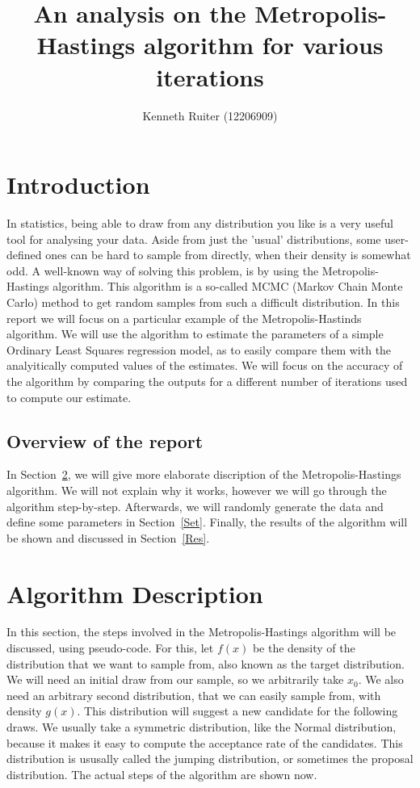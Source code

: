 \documentclass[a4paper,10pt]{article}\usepackage[]{graphicx}\usepackage[]{color}
\title{An analysis on the Metropolis-Hastings algorithm for various iterations}
\author{Kenneth Ruiter (12206909)}
\begin{document}


\maketitle
\newpage

\tableofcontents
\newpage

\section{Introduction}

In statistics, being able to draw from any distribution you like is a very useful tool for analysing your data. Aside from just the 'usual' distributions, some user-defined ones can be hard to sample from directly, when their density is somewhat odd. A well-known way of solving this problem, is by using the Metropolis-Hastings algorithm. This algorithm is a so-called MCMC (Markov Chain Monte Carlo) method to get random samples from such a difficult distribution. In this report we will focus on a particular example of the Metropolis-Hastinds algorithm. We will use the algorithm to estimate the parameters of a simple Ordinary Least Squares regression model, as to easily compare them with the analyitically computed values of the estimates. We will focus on the accuracy of the algorithm by comparing the outputs for a different number of iterations used to compute our estimate.

\subsection{Overview of the report}
In Section~\ref{AD}, we will give more elaborate discription of the Metropolis-Hastings algorithm. We will not explain why it works, however we will go through the algorithm step-by-step. Afterwards, we will randomly generate the data and define some parameters in Section~\ref{Set}. Finally, the results of the algorithm will be shown and discussed in Section~\ref{Res}.

\newpage
\section{Algorithm Description}\label{AD}

In this section, the steps involved in the Metropolis-Hastings algorithm will be discussed, using pseudo-code. For this, let $f(x)$ be the density of the distribution that we want to sample from, also known as the target distribution. We will need an initial draw from our sample, so we arbitrarily take $x_0$. We also need an arbitrary second distribution, that we can easily sample from, with density $g(x)$. This distribution will suggest a new candidate for the following draws. We usually take a symmetric distribution, like the Normal distribution, because it makes it easy to compute the acceptance rate of the candidates. This distribution is ususally called the jumping distribution, or sometimes the proposal distribution. The actual steps of the algorithm are shown now.
\end{document}
